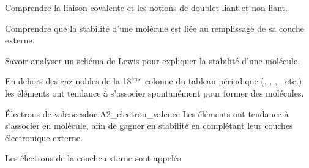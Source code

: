 \teteSndMole



\begin{objectifs}
  \item Comprendre la liaison covalente et les notions de doublet liant et non-liant.
  \item Comprendre que la stabilité d'une molécule est liée au remplissage de sa couche externe.
  \item Savoir analyser un schéma de Lewis pour expliquer la stabilité d'une molécule.
\end{objectifs}

\begin{contexte}
  En dehors des gaz nobles de la 18$^\text{ème}$ colonne du tableau périodique (, , , , etc.), les éléments ont tendance à s'associer spontanément pour former des molécules. 
  
\end{contexte}



\begin{doc}{Électrons de valences}{doc:A2_electron_valence}
  Les éléments ont tendance à s'associer en molécule, afin de gagner en stabilité en complétant leur couches électronique externe.  \begin{importants}  
    Les électrons de la couche externe sont appelés 
  \end{importants}  
\end{doc}
  
